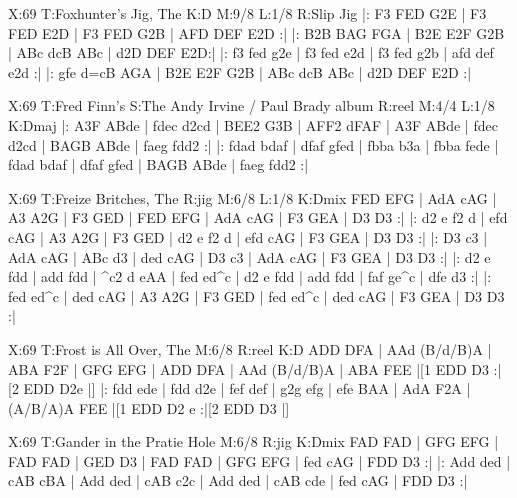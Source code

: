 \documentclass[letterpaper]{article}
\begin{document}
\begin{abc}[name]
X:69
T:Foxhunter's Jig, The
K:D
M:9/8
L:1/8
R:Slip Jig
|: F3 FED G2E | F3 FED E2D | F3 FED G2B | AFD DEF E2D :|
|: B2B BAG FGA | B2E E2F G2B | ABc dcB ABc | d2D DEF E2D:|
|: f3 fed g2e | f3 fed e2d | f3 fed g2b | afd def e2d :|
|: gfe d=cB AGA | B2E E2F G2B | ABc dcB ABc | d2D DEF E2D :|
\end{abc}

\begin{abc}[name]
X:69
T:Fred Finn's
S:The Andy Irvine / Paul Brady album
R:reel
M:4/4
L:1/8
K:Dmaj
|: A3F ABde | fdec d2cd | BEE2 G3B | AFF2 dFAF |
A3F ABde | fdec d2cd | BAGB ABde | faeg fdd2 :|
|: fdad bdaf | dfaf gfed | fbba b3a | fbba fede |
fdad bdaf | dfaf gfed | BAGB ABde | faeg fdd2 :|
\end{abc}

\begin{abc}[name]
X:69
T:Freize Britches, The
R:jig
M:6/8
L:1/8
K:Dmix
FED EFG | AdA cAG | A3 A2G | F3 GED |
FED EFG | AdA cAG | F3 GEA | D3 D3 :|
|: d2 e f2 d | efd cAG | A3 A2G | F3 GED |
d2 e f2 d | efd cAG | F3 GEA | D3 D3 :|
|: D3 c3 | AdA cAG | ABc d3 | ded cAG |
D3 c3 | AdA cAG | F3 GEA | D3 D3 :|
|: d2 e fdd | add fdd | ^c2 d eAA | fed ed^c |
d2 e fdd | add fdd | faf ge^c | dfe d3 :|
|: fed ed^c | ded cAG | A3 A2G | F3 GED |
fed ed^c | ded cAG | F3 GEA | D3 D3 :|
\end{abc}

\begin{abc}[name]
X:69
T:Frost is All Over, The
M:6/8
R:reel
K:D
ADD DFA | AAd (B/d/B)A | ABA F2F | GFG EFG |
ADD DFA | AAd (B/d/B)A | ABA FEE |[1 EDD D3 :|[2 EDD D2e |]
|: fdd ede | fdd d2e | fef def | g2g efg |
efe BAA | AdA F2A | (A/B/A)A FEE |[1 EDD D2 e :|[2 EDD D3 |]
\end{abc}

\begin{abc}[name]
X:69
T:Gander in the Pratie Hole
M:6/8
R:jig
K:Dmix
FAD FAD | GFG EFG | FAD FAD | GED D3 |
FAD FAD | GFG EFG | fed cAG | FDD D3 :|
|: Add ded | cAB cBA | Add ded | cAB c2c |
Add ded | cAB cde | fed cAG | FDD D3 :|
\end{abc}
\end{document}
